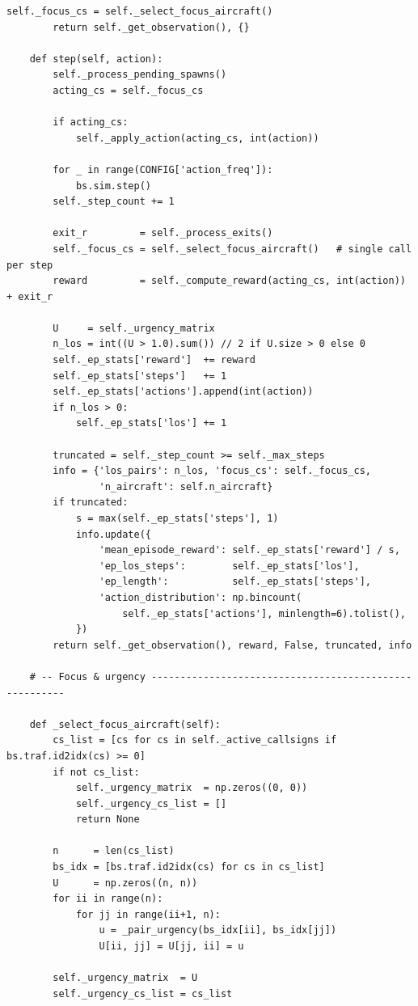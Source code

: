 \documentclass[10pt, a4paper]{article}
\begin{document}
\begin{lstlisting}[caption={v3\_simple\_env.py --- ATCO conflict-resolution environment}, label=lst:env]
        self._focus_cs = self._select_focus_aircraft()
        return self._get_observation(), {}

    def step(self, action):
        self._process_pending_spawns()
        acting_cs = self._focus_cs

        if acting_cs:
            self._apply_action(acting_cs, int(action))

        for _ in range(CONFIG['action_freq']):
            bs.sim.step()
        self._step_count += 1

        exit_r         = self._process_exits()
        self._focus_cs = self._select_focus_aircraft()   # single call per step
        reward         = self._compute_reward(acting_cs, int(action)) + exit_r

        U     = self._urgency_matrix
        n_los = int((U > 1.0).sum()) // 2 if U.size > 0 else 0
        self._ep_stats['reward']  += reward
        self._ep_stats['steps']   += 1
        self._ep_stats['actions'].append(int(action))
        if n_los > 0:
            self._ep_stats['los'] += 1

        truncated = self._step_count >= self._max_steps
        info = {'los_pairs': n_los, 'focus_cs': self._focus_cs,
                'n_aircraft': self.n_aircraft}
        if truncated:
            s = max(self._ep_stats['steps'], 1)
            info.update({
                'mean_episode_reward': self._ep_stats['reward'] / s,
                'ep_los_steps':        self._ep_stats['los'],
                'ep_length':           self._ep_stats['steps'],
                'action_distribution': np.bincount(
                    self._ep_stats['actions'], minlength=6).tolist(),
            })
        return self._get_observation(), reward, False, truncated, info

    # -- Focus & urgency -------------------------------------------------------

    def _select_focus_aircraft(self):
        cs_list = [cs for cs in self._active_callsigns if bs.traf.id2idx(cs) >= 0]
        if not cs_list:
            self._urgency_matrix  = np.zeros((0, 0))
            self._urgency_cs_list = []
            return None

        n      = len(cs_list)
        bs_idx = [bs.traf.id2idx(cs) for cs in cs_list]
        U      = np.zeros((n, n))
        for ii in range(n):
            for jj in range(ii+1, n):
                u = _pair_urgency(bs_idx[ii], bs_idx[jj])
                U[ii, jj] = U[jj, ii] = u

        self._urgency_matrix  = U
        self._urgency_cs_list = cs_list


\end{lstlisting}
\end{document}
